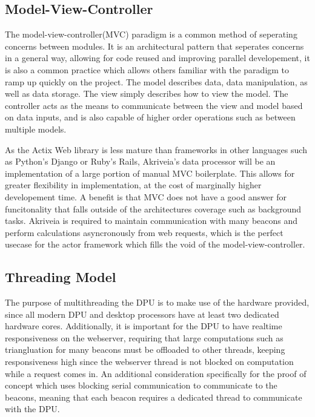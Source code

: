 \bigskip
\subsection{Model-View-Controller}
The model-view-controller(MVC) paradigm is a common method of seperating concerns between modules.
It is an architectural pattern that seperates concerns in a general way, allowing for code reused and improving parallel developement, it is also a common practice which allows others familiar with the paradigm to ramp up quickly on the project.
The model describes data, data manipulation, as well as data storage.
The view simply describes how to view the model.
The controller acts as the means to communicate between the view and model based on data inputs, and is also capable of higher order operations such as between multiple models.

\bigskip
As the Actix Web library is less mature than frameworks in other languages such as Python's Django or Ruby's Rails, Akriveia's data processor will be an implementation of a large portion of manual MVC boilerplate.
This allows for greater flexibility in implementation, at the cost of marginally higher developement time.
A benefit is that MVC does not have a good answer for funcitonality that falls outside of the architectures coverage such as background tasks.
Akriveia is required to maintain communication with many beacons and perform calculations asyncronously from web requests, which is the perfect usecase for the actor framework which fills the void of the model-view-controller.


\bigskip
\pagebreak
\subsection{Threading Model}
The purpose of multithreading the DPU is to make use of the hardware provided, since all modern DPU and desktop processors have at least two dedicated hardware cores.
Additionally, it is important for the DPU to have realtime responsiveness on the webserver, requiring that large computations such as triangluation for many beacons must be offloaded to other threads, keeping responsiveness high since the webserver thread is not blocked on computation while a request comes in. An additional consideration specifically for the proof of concept which uses blocking serial communication to communicate to the beacons, meaning that each beacon requires a dedicated thread to communicate with the DPU.

